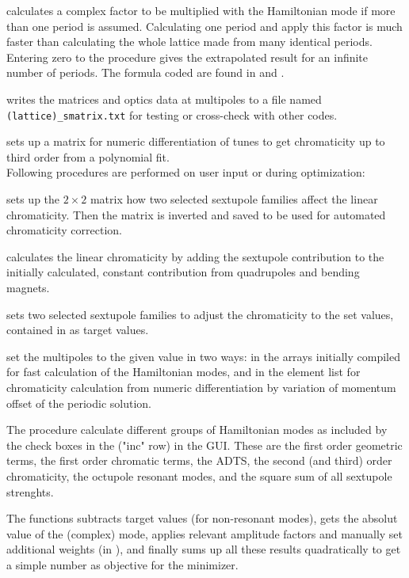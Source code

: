 \documentclass[12pt]{article}
\newcommand\code[1]{{\tt #1}}
\newcommand{\ofldx}[1]{\colorbox{black!15}{{\color{black}(#1)}}}
\newcommand{\unico}[1]{{\color{burntorange}\code{#1}}}
\newcommand{\opagui}[1]{\colorbox{blue!20}{{\color{black}\code{#1}}}}
\newcommand{\ogui}[1]{\hyperref[#1]{\opagui{#1}}}
\newcommand{\opaguif}[1]{\colorbox{violet!30}{{\color{black}\code{#1}}}}
\newcommand{\oguif}[1]{\hyperref[#1]{\opaguif{#1}}}
\begin{document}
{\unico{S\_Period} calculates a complex factor to be multiplied with the Hamiltonian mode if more than one period is assumed. Calculating one period and apply this factor is much faster than calculating the whole lattice made from many identical periods. Entering zero to the procedure gives the extrapolated result for an infinite number of periods. The formula coded are found in \cite{jbsls} and \cite{inside}.

\unico{S\_TestOut} writes the matrices and optics data at multipoles to a file named \code{(lattice)\_smatrix.txt} for testing or cross-check with other codes.

\unico{set\_cd\_matrix} sets up a matrix for numeric differentiation of tunes to get chromaticity up to third order from a polynomial fit.\\[1ex]

Following procedures are performed on user input or during optimization:

\unico{UpdateChromMatrix} sets up the $2\times 2$ matrix how two selected sextupole families affect the linear chromaticity. Then the matrix is inverted and saved to be used for automated chromaticity correction.

\unico{getLinChroma} calculates the linear chromaticity by adding the sextupole contribution to the initially calculated, constant contribution from quadrupoles and bending magnets.

\unico{ChromCorrect} sets two selected sextupole families to adjust the chromaticity to the set values, contained in \unico{HamTarg([0],[1])} as target values.

\unico{Update(SexFam, SexFamInt, OcFamInt)} set the multipoles to the given value in two ways: in the arrays initially compiled for fast calculation of the Hamiltonian modes, and in the element list \unico{Ella} for chromaticity calculation from numeric differentiation by variation of momentum offset of the periodic solution.

The \unico{DriveTerms\dots} procedure calculate different groups of Hamiltonian modes as included by the check boxes in the \ofldx{"inc" row} in the \ogui{opachroma} GUI. These are the first order geometric terms, the first order chromatic terms, the ADTS, the second (and third) order chromaticity, the octupole resonant modes, and the square sum of all sextupole strenghts.

The \unico{Penalty} functions subtracts target values (for non-resonant modes), gets the absolut value of the (complex) mode, applies relevant amplitude factors and manually set additional weights (in \oguif{chamframe}), and finally sums up all these results quadratically to get a simple number as objective for the minimizer.

}
\end{document}
